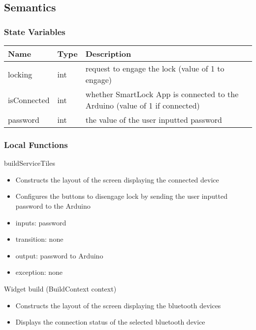 \documentclass[12pt, titlepage]{article}
\begin{document}
\subsection{Semantics}

\subsubsection{State Variables}

\begin{center}
\begin{tabular}{p{4cm} p{4cm} p{6cm}}
\hline
\textbf{Name} & \textbf{Type} & \textbf{Description} \\
\hline
locking & int & request to engage the lock (value of 1 to engage) \\
isConnected & int & whether SmartLock App is connected to the Arduino (value of 1 if connected) \\
password & int & the value of the user inputted password \\
\hline
\end{tabular}
\end{center}

\subsubsection{Local Functions}

\noindent buildServiceTiles
\begin{itemize}
\item Constructs the layout of the screen displaying the connected device
\item Configures the buttons to disengage lock by sending the user inputted password to the Arduino 
\end{itemize}

\begin{itemize}
\item inputs: password
\item transition: none
\item output: password to Arduino
\item exception: none
\end{itemize}

\noindent Widget build (BuildContext context)
\begin{itemize}
\item Constructs the layout of the screen displaying the bluetooth devices
\item Displays the connection status of the selected bluetooth device
\end{itemize}
\end{document}
